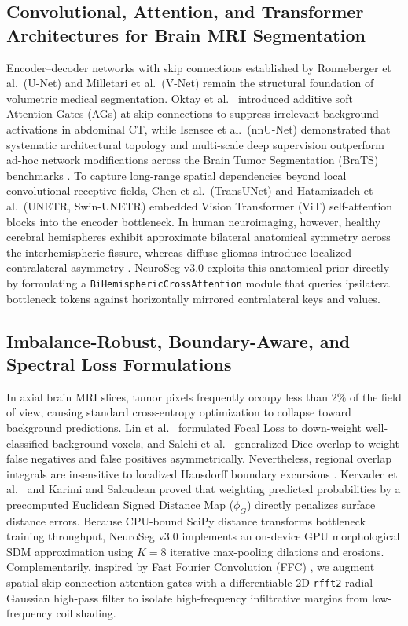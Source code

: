\documentclass[conference]{IEEEtran}
\begin{document}
\subsection{Convolutional, Attention, and Transformer Architectures for Brain MRI Segmentation}
Encoder--decoder networks with skip connections established by Ronneberger et al.\ (U-Net) \cite{ronneberger2015unet} and Milletari et al.\ (V-Net) \cite{milletari2016vnet} remain the structural foundation of volumetric medical segmentation. Oktay et al.\ \cite{oktay2018attention} introduced additive soft Attention Gates (AGs) at skip connections to suppress irrelevant background activations in abdominal CT, while Isensee et al.\ (nnU-Net) \cite{isensee2021nnunet} demonstrated that systematic architectural topology and multi-scale deep supervision outperform ad-hoc network modifications across the Brain Tumor Segmentation (BraTS) benchmarks \cite{menze2015brats, bakas2017advancing}. To capture long-range spatial dependencies beyond local convolutional receptive fields, Chen et al.\ (TransUNet) \cite{chen2021transunet} and Hatamizadeh et al.\ (UNETR, Swin-UNETR) \cite{hatamizadeh2022unetr, hatamizadeh2021swinunetr} embedded Vision Transformer (ViT) self-attention blocks \cite{dosovitskiy2021vit, vaswani2017attention} into the encoder bottleneck. In human neuroimaging, however, healthy cerebral hemispheres exhibit approximate bilateral anatomical symmetry across the interhemispheric fissure, whereas diffuse gliomas introduce localized contralateral asymmetry \cite{buda2019association, zhou2018unetplusplus}. NeuroSeg v3.0 exploits this anatomical prior directly by formulating a \texttt{BiHemisphericCrossAttention} module that queries ipsilateral bottleneck tokens against horizontally mirrored contralateral keys and values.

\subsection{Imbalance-Robust, Boundary-Aware, and Spectral Loss Formulations}
In axial brain MRI slices, tumor pixels frequently occupy less than $2\%$ of the field of view, causing standard cross-entropy optimization to collapse toward background predictions. Lin et al.\ \cite{lin2017focal} formulated Focal Loss to down-weight well-classified background voxels, and Salehi et al.\ \cite{salehi2017tversky} generalized Dice overlap to weight false negatives and false positives asymmetrically. Nevertheless, regional overlap integrals are insensitive to localized Hausdorff boundary excursions \cite{reinke2024metrics}. Kervadec et al.\ \cite{kervadec2021boundary} and Karimi and Salcudean \cite{karimi2020hd} proved that weighting predicted probabilities by a precomputed Euclidean Signed Distance Map ($\phi_G$) directly penalizes surface distance errors. Because CPU-bound SciPy distance transforms bottleneck training throughput, NeuroSeg v3.0 implements an on-device GPU morphological SDM approximation using $K = 8$ iterative max-pooling dilations and erosions. Complementarily, inspired by Fast Fourier Convolution (FFC) \cite{chi2020ffc}, we augment spatial skip-connection attention gates with a differentiable 2D \texttt{rfft2} radial Gaussian high-pass filter to isolate high-frequency infiltrative margins from low-frequency coil shading.
\end{document}
